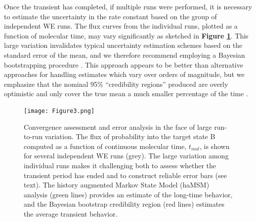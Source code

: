 Once the transient has completed, if multiple runs were performed, it is necessary to estimate the uncertainty in the rate constant based on the group of independent WE runs. 
The flux curves from the individual runs, plotted as a function of molecular time, may vary significantly as sketched in \textbf{Figure \ref{fig:converge}}. 
This large variation invalidates typical uncertainty estimation schemes based on the standard error of the mean, and we therefore recommend employing a Bayesian bootstrapping procedure \citep{mostofian_statistical_2019}. 
This approach appears to be better than alternative approaches for handling estimates which vary over orders of magnitude, but we emphasize that the nominal 95\% “credibility regions” produced are overly optimistic and only cover the true mean a much smaller percentage of the time \citep{mostofian_statistical_2019}.
\vspace{-0.1cm}

\begin{figure}
\texttt{[image: Figure3.png]}
\caption{Convergence assessment and error analysis in the face of large run-to-run variation. 
The flux of probability into the target state B computed as a function of continuous molecular time, $t_{mol}$, is shown for several independent WE runs (grey). 
The large variation among individual runs makes it challenging both to assess whether the transient period has ended and to construct reliable error bars (see text). 
The history augmented Markov State Model (haMSM) analysis (green lines) provides an estimate of the long-time behavior, and the Bayesian bootstrap credibility region (red lines) estimates the average transient behavior.}
\label{fig:converge}
\end{figure}


